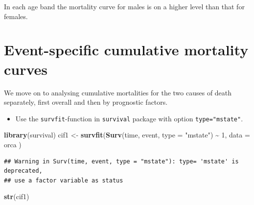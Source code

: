 \documentclass[
]{book}
\newenvironment{Shaded}{\begin{snugshade}}{\end{snugshade}}
\newcommand{\AttributeTok}[1]{\textcolor[rgb]{0.13,0.29,0.53}{#1}}
\newcommand{\DecValTok}[1]{\textcolor[rgb]{0.00,0.00,0.81}{#1}}
\newcommand{\FunctionTok}[1]{\textcolor[rgb]{0.13,0.29,0.53}{\textbf{#1}}}
\newcommand{\NormalTok}[1]{#1}
\newcommand{\OtherTok}[1]{\textcolor[rgb]{0.56,0.35,0.01}{#1}}
\newcommand{\SpecialCharTok}[1]{\textcolor[rgb]{0.81,0.36,0.00}{\textbf{#1}}}
\newcommand{\StringTok}[1]{\textcolor[rgb]{0.31,0.60,0.02}{#1}}
\providecommand{\tightlist}{%
  \setlength{\itemsep}{0pt}\setlength{\parskip}{0pt}}
\begin{document}
In each age band the mortality curve for males is on a higher level
than that for females.

\section{Event-specific cumulative mortality curves}\label{event-specific-cumulative-mortality-curves}

We move on to analysing cumulative mortalities for the
two causes of death separately, first overall and then
by prognostic factors.

\begin{itemize}
\tightlist
\item
  Use the \texttt{survfit}-function in \texttt{survival} package with option \texttt{type="mstate"}.
\end{itemize}

\begin{Shaded}
\begin{Highlighting}[]
\FunctionTok{library}\NormalTok{(survival)}
\NormalTok{cif1 }\OtherTok{\textless{}{-}} \FunctionTok{survfit}\NormalTok{(}\FunctionTok{Surv}\NormalTok{(time, event, }\AttributeTok{type =} \StringTok{"mstate"}\NormalTok{) }\SpecialCharTok{\textasciitilde{}} \DecValTok{1}\NormalTok{,}
  \AttributeTok{data =}\NormalTok{ orca}
\NormalTok{)}
\end{Highlighting}
\end{Shaded}

\begin{verbatim}
## Warning in Surv(time, event, type = "mstate"): type= 'mstate' is deprecated,
## use a factor variable as status
\end{verbatim}

\begin{Shaded}
\begin{Highlighting}[]
\FunctionTok{str}\NormalTok{(cif1)}
\end{Highlighting}
\end{Shaded}
\end{document}
